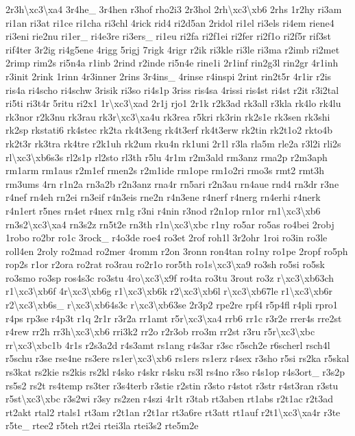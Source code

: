 {2r3h\textbackslash{}xc3\textbackslash{}xa4 3r4he\-\_\- 3r4hen r3hof rho2i3 2r3hol 2rh\textbackslash{}xc3\textbackslash{}xb6 2rhs 1r2hy ri3am ri1an ri3at ri1ce ri1cha ri3chl 4rick rid4 ri2d5an 2ridol ri1el ri3els ri4em riene4 ri3eni rie2nu ri1er\-\_\- ri4e3re ri3ers\-\_\- ri1eu ri2fa ri2f1ei ri2fer ri2f1o ri2f5r rif3st rif4ter 3r2ig ri4g5ene 4rigg 5rigj 7rigk 4rigr r2ik ri3kle ri3le ri3ma r2imb ri2met 2rimp rim2s ri5n4a r1inb 2rind r2inde ri5n4e rine1i 2r1inf rin2g3l rin2gr 4r1inh r3init 2rink 1rinn 4r3inner 2rins 3r4ins\-\_\- 4rinse r4inspi 2rint rin2t5r 4r1ir r2is ris4a ri4scho ri4schw 3risik ri3so ri4s1p 3riss ris4sa 4rissi ris4st ri4st r2it r3i2tal ri5ti ri3t4r 5ritu ri2x1 1r\textbackslash{}xc3\textbackslash{}xad 2r1j rjo1 2r1k r2k3ad rk3all r3kla rk4lo rk4lu rk3nor r2k3nu rk3rau rk3r\textbackslash{}xc3\textbackslash{}xa4u rk3rea r5kri rk3rin rk2s1e rk3sen rk3shi rk2sp rkstati6 rk4stec rk2ta rk4t3eng rk4t3erf rk4t3erw rk2tin rk2t1o2 rkto4b rk2t3r rk3tra rk4tre r2k1uh rk2um rku4n rk1uni 2r1l r3la rla5m rle2a r3l2i rli2s rl\textbackslash{}xc3\textbackslash{}xb6s3s rl2s1p rl2sto rl3th r5lu 4r1m r2m3ald rm3anz rma2p r2m3aph rm1arm rm1aus r2m1ef rmen2s r2m1ide rm1ope rm1o2ri rmo3s rmt2 rmt3h rm3ums 4rn r1n2a rn3a2b r2n3anz rna4r rn5ari r2n3au rn4aue rnd4 rn3dr r3ne r4nef rn4eh rn2ei rn3eif r4n3eis rne2n r4n3ene r4nerf r4nerg rn4erhi r4nerk r4n1ert r5nes rn4et r4nex rn1g r3ni r4nin r3nod r2n1op rn1or rn1\textbackslash{}xc3\textbackslash{}xb6 rn3s2\textbackslash{}xc3\textbackslash{}xa4 rn3s2z rn5t2e rn3th r1n\textbackslash{}xc3\textbackslash{}xbc r1ny ro5ar ro5as ro4bei 2robj 1robo ro2br ro1c 3rock\-\_\- r4o3de roe4 ro3et 2rof roh1l 3r2ohr 1roi ro3in ro3le roll4en 2roly ro2mad ro2mer 4romm r2on 3ronn ron4tan ro1ny ro1pe 2ropf ro5ph rop2s r1or r2ora ro2rat ro3rau ro2r1o ror5th ro1s\textbackslash{}xc3\textbackslash{}xa9 ro3sh ro5si ro5sk ro3smo ro3sp ros4s3c ro3stu 4ro\textbackslash{}xc3\textbackslash{}x9f ro4ta ro3tu 3rout ro3z r\textbackslash{}xc3\textbackslash{}xb63ch r1\textbackslash{}xc3\textbackslash{}xb6f 4r\textbackslash{}xc3\textbackslash{}xb6g r1\textbackslash{}xc3\textbackslash{}xb6k r2\textbackslash{}xc3\textbackslash{}xb6l r\textbackslash{}xc3\textbackslash{}xb67le r1\textbackslash{}xc3\textbackslash{}xb6r r2\textbackslash{}xc3\textbackslash{}xb6s\-\_\- r\textbackslash{}xc3\textbackslash{}xb64s3c r\textbackslash{}xc3\textbackslash{}xb63se 2r3p2 rpe2re rpf4 r5p4fl r4pli rpro1 r4ps rp3se r4p3t r1q 2r1r r3r2a rr1amt r5r\textbackslash{}xc3\textbackslash{}xa4 rrb6 rr1c r3r2e rrer4s rre2st r4rew rr2h rr3h\textbackslash{}xc3\textbackslash{}xb6 rri3k2 rr2o r2r3ob rro3m rr2st r3ru r5r\textbackslash{}xc3\textbackslash{}xbc rr\textbackslash{}xc3\textbackslash{}xbc1b 4r1s r2s3a2d r4s3amt rs1ang r4s3ar r3sc r5sch2e r6scherl rsch4l r5schu r3se rse4ne rs3ere rs1er\textbackslash{}xc3\textbackslash{}xb6 rs1ers rs1erz r4sex r3sho r5si rs2ka r5skal rs3kat rs2kie rs2kis rs2kl r4sko r4skr r4sku rs3l rs4no r3so r4s1op r4s3ort\-\_\- r3s2p rs5s2 rs2t rs4temp rs3ter r3s4terb r3stie r2stin r3sto r4stot r3str r4st3ran r3stu r5st\textbackslash{}xc3\textbackslash{}xbc r3s2wi r3sy rs2zen r4szi 4r1t r3tab rt3aben rt1abs r2t1ac r2t3ad rt2akt rtal2 rtals1 rt3am r2t1an r2t1ar rt3a6re rt3att rt1auf r2t1\textbackslash{}xc3\textbackslash{}xa4r r3te r5te\-\_\- rtee2 r5teh rt2ei rtei3la rtei3s2 rte5m2e }
